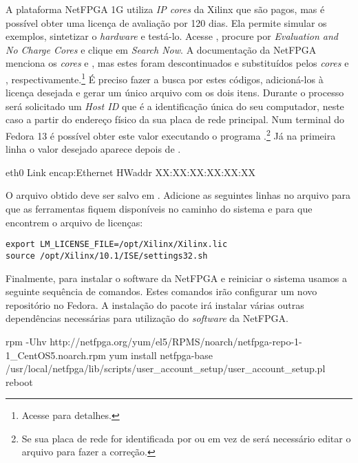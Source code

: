 A plataforma NetFPGA 1G utiliza \emph{IP cores} da Xilinx que são
pagos, mas é possível obter uma licença de avaliação por 120 dias.
Ela permite simular os exemplos, sintetizar o \emph{hardware} e
testá-lo. Acesse , procure
por \emph{Evaluation and No Charge Cores} e clique em \emph{Search
Now}. A documentação da NetFPGA menciona os \emph{cores}
 e , mas estes foram
descontinuados e substituídos pelos \emph{cores}
 e ,
respectivamente.\footnote{Acesse
para detalhes.} É preciso fazer a busca por estes códigos,
adicioná-los à licença desejada e gerar um único arquivo com os dois
itens. Durante o processo será solicitado um \emph{Host ID} que é a
identificação única do seu computador, neste caso a partir do
endereço físico da sua placa de rede principal. Num terminal do
Fedora 13 é possível obter este valor executando o programa
.\footnote{Se sua placa de rede for identificada por
 ou  em vez de  será necessário
editar o arquivo 
para fazer a correção.} Já na primeira linha o valor desejado
aparece depois de .

\begin{verbnobox}[\small]
eth0      Link encap:Ethernet  HWaddr XX:XX:XX:XX:XX:XX
\end{verbnobox}

O arquivo obtido deve ser salvo em .
Adicione as seguintes linhas no arquivo  para que
as ferramentas fiquem disponíveis no caminho do sistema e para que
encontrem o arquivo de licenças:

\begin{verbatim}
export LM_LICENSE_FILE=/opt/Xilinx/Xilinx.lic
source /opt/Xilinx/10.1/ISE/settings32.sh
\end{verbatim}

Finalmente, para instalar o software da NetFPGA e reiniciar o
sistema usamos a seguinte sequência de comandos.  Estes comandos
irão configurar um novo repositório no Fedora.  A instalação do
pacote  irá instalar várias outras dependências
necessárias para utilização do \emph{software} da NetFPGA.

\begin{verbnobox}[\small]
rpm -Uhv http://netfpga.org/yum/el5/RPMS/noarch/netfpga-repo-1-1_CentOS5.noarch.rpm
yum install netfpga-base
/usr/local/netfpga/lib/scripts/user_account_setup/user_account_setup.pl
reboot
\end{verbnobox}

